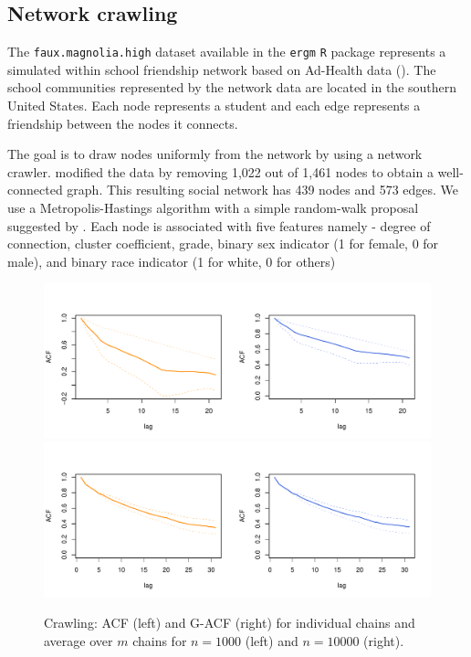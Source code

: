 \documentclass[11pt]{article}
\theoremstyle{remark}
\begin{document}

\subsection{Network crawling}


The \texttt{faux.magnolia.high} dataset available in the \texttt{ergm} \texttt{R} package represents a simulated within school friendship network based on Ad-Health data (\cite{resnick1997protecting}). The school communities represented by the network data are located in the southern United States. Each node represents a student and each edge represents a friendship between the nodes it connects.

The goal is to draw nodes uniformly from the network by using a network crawler. \cite{nilakanta2019ensuring} modified the data by removing 1,022 out of 1,461 nodes to obtain a well-connected graph. This resulting social network has 439 nodes and 573 edges. We use a Metropolis-Hastings algorithm with a simple random-walk  proposal suggested by \cite{gjoka2011practical}. Each node is associated with five features namely - degree of connection, cluster coefficient, grade, binary sex indicator (1 for female, 0 for male), and binary race indicator (1 for white, 0 for others)

\begin{figure}
    \centering
      \includegraphics[width = .6\textwidth]{plots/magnolia-acf_n100.pdf}
      \includegraphics[width = .6\textwidth]{plots/magnolia-acf_n1000.pdf}

    \caption{Crawling: ACF (left) and G-ACF (right) for individual chains and average over $m$ chains for $n = 1000$ (left) and $n = 10000$ (right).}
    \label{fig:magnolia-acf}
\end{figure}
\end{document}
